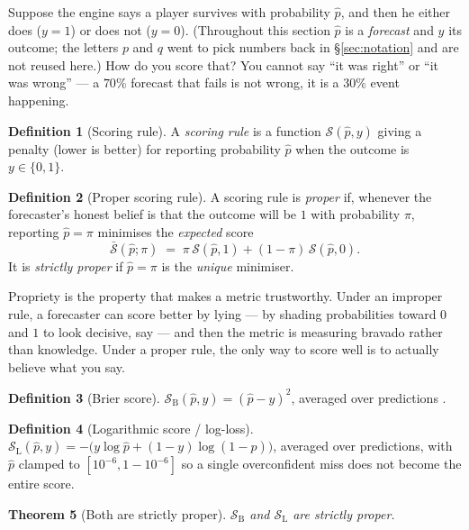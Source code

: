 \documentclass[10pt,a4paper]{article}
\theoremstyle{plain}
\newtheorem{theorem}{Theorem}[section]
\theoremstyle{definition}
\newtheorem{definition}[theorem]{Definition}
\theoremstyle{remark}
\begin{document}
Suppose the engine says a player survives with probability $\hat p$, and then he either
does ($y = 1$) or does not ($y = 0$). (Throughout this section $\hat p$ is a
\emph{forecast} and $y$ its outcome; the letters $p$ and $q$ went to pick numbers back in
\S\ref{sec:notation} and are not reused here.) How do you score that? You cannot say ``it
was right'' or ``it was wrong'' --- a $70\%$ forecast that fails is not wrong, it is a
$30\%$ event happening.

\begin{definition}[Scoring rule]
A \emph{scoring rule} is a function $\mathcal{S}(\hat p, y)$ giving a penalty (lower is
better) for reporting probability $\hat p$ when the outcome is $y \in \{0,1\}$.
\end{definition}

\begin{definition}[Proper scoring rule]
A scoring rule is \emph{proper} if, whenever the forecaster's honest belief is that the
outcome will be $1$ with probability $\pi$, reporting $\hat p = \pi$ minimises the
\emph{expected} score
\[
\bar{\mathcal{S}}(\hat p;\pi) \;=\; \pi\, \mathcal{S}(\hat p,1) + (1-\pi)\, \mathcal{S}(\hat p,0).
\]
It is \emph{strictly proper} if $\hat p = \pi$ is the \emph{unique} minimiser.
\end{definition}

Propriety is the property that makes a metric trustworthy. Under an improper rule, a
forecaster can score better by lying --- by shading probabilities toward $0$ and $1$ to
look decisive, say --- and then the metric is measuring bravado rather than knowledge.
Under a proper rule, the only way to score well is to actually believe what you say.

\begin{definition}[Brier score]
$\mathcal{S}_{\mathrm{B}}(\hat p,y) = (\hat p - y)^2$, averaged over predictions
\cite{brier1950}.
\end{definition}

\begin{definition}[Logarithmic score / log-loss]
$\mathcal{S}_{\mathrm{L}}(\hat p,y) = -\big(y \log \hat p + (1-y)\log(1-\hat p)\big)$,
averaged over predictions, with $\hat p$ clamped to $[10^{-6}, 1-10^{-6}]$ so a single
overconfident miss does not become the entire score.
\end{definition}

\begin{theorem}[Both are strictly proper]
\label{thm:proper}
$\mathcal{S}_{\mathrm{B}}$ and $\mathcal{S}_{\mathrm{L}}$ are strictly proper.
\end{theorem}
\end{document}
